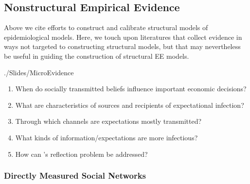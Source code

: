 \subsection{Nonstructural Empirical Evidence}\label{subsec:microEvidence}



Above we cite efforts to construct and calibrate structural models of epidemiological models.  %
Here, we touch upon literatures that collect evidence in ways not targeted to constructing structural models, but that may nevertheless be useful in guiding the construction of structural EE models.

\begin{verbatimwrite}{./Slides/MicroEvidence}
  \begin{enumerate}
  \item When do socially transmitted beliefs influence important economic decisions?
  \item What are characteristics of sources and recipients of expectational infection?
  \item Through which channels are expectations mostly transmitted?
  \item What kinds of information/expectations are more infectious?
  \item How can \cite{manski1993identification}'s reflection problem be addressed?
  \end{enumerate}
\end{verbatimwrite}



\subsubsection{Directly Measured Social Networks}\label{subsubsec:socialnetworks}

